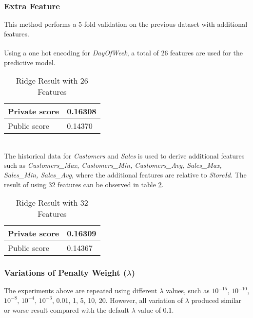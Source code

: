 \subsubsection{Extra Feature}
This method performs a 5-fold validation on the previous dataset with additional features. \\ \\
Using a one hot encoding for \textit{DayOfWeek}, a total of 26 features are used for the predictive model.
\begin{table}[h]
	\centering
	\caption{Ridge Result with 26 Features}
	\label{tab:ridge_extra_feature_1}
	\begin{tabular}{|m{100pt}|m{50pt}|}
		\hline
		Private score & 0.16308 \\ \hline
		Public score  & 0.14370 \\ \hline
	\end{tabular}
\end{table}
\\
The historical data for \textit{Customers} and \textit{Sales} is used to derive additional features such as \textit{Customers\_Max, Customers\_Min, Customers\_Avg, Sales\_Max, Sales\_Min, Sales\_Avg}, where the additional features are relative to \textit{StoreId}. The result of using 32 features can be observed in table \ref{tab:ridge_extra_feature_2}.
\begin{table}[h]
	\centering
	\caption{Ridge Result with 32 Features}
	\label{tab:ridge_extra_feature_2}
	\begin{tabular}{|m{100pt}|m{50pt}|}
		\hline
		Private score & 0.16309 \\ \hline
		Public score  & 0.14367 \\ \hline
	\end{tabular}
\end{table}

\subsubsection{Variations of Penalty Weight ($\lambda$)}
The experiments above are repeated using different $\lambda$ values, such as $10^{-15}$, $10^{-10}$, $10^{-8}$, $10^{-4}$, $10^{-3}$, 0.01, 1, 5, 10, 20.
However, all variation of $\lambda$ produced similar or worse result compared with the default $\lambda$ value of 0.1.

